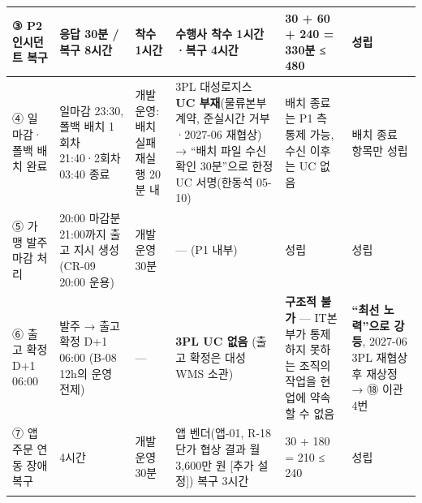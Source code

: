 \documentclass[10pt,a4paper]{article}
\begin{document}
{\begin{tabularx}{\linewidth}{|L{24mm}|L{40mm}|L{44mm}|Y|L{46mm}|L{30mm}|}
③ P2 인시던트 복구 & 응답 30분 / 복구 8시간 & 착수 1시간 & 수행사 착수 1시간·복구 4시간 & 30 + 60 + 240 = 330분 ≤ 480 & 성립 \\ \hline
④ 일마감·폴백 배치 완료 & 일마감 23:30, 폴백 배치 1회차 21:40·2회차 03:40 종료 & 개발운영: 배치 실패 재실행 20분 내 & 3PL 대성로지스 \textbf{UC 부재}(물류본부 계약, 준실시간 거부·2027-06 재협상) → “배치 파일 수신 확인 30분”으로 한정 UC 서명(한동석 05-10) & 배치 종료는 P1 측 통제 가능, 수신 이후는 UC 없음 & 배치 종료 항목만 성립 \\ \hline
⑤ 가맹 발주 마감 처리 & 20:00 마감분 21:00까지 출고 지시 생성(CR-09 20:00 운용) & 개발운영 30분 & — (P1 내부) & 성립 & 성립 \\ \hline
⑥ 출고 확정 D+1 06:00 & 발주 → 출고 확정 D+1 06:00 (B-08 12h의 운영 전제) & — & \textbf{3PL UC 없음} (출고 확정은 대성 WMS 소관) & \textbf{구조적 불가} — IT본부가 통제하지 못하는 조직의 작업을 현업에 약속할 수 없음 & \textbf{“최선 노력”으로 강등}, 2027-06 3PL 재협상 후 재상정 → ⑱ 이관 4번 \\ \hline
⑦ 앱 주문 연동 장애 복구 & 4시간 & 개발운영 30분 & 앱 벤더(앱-01, R-18 단가 협상 결과 월 3,600만 원 [추가 설정]) 복구 3시간 & 30 + 180 = 210 ≤ 240 & 성립 \\ \hline
\fi
\end{tabularx}}
\end{document}

